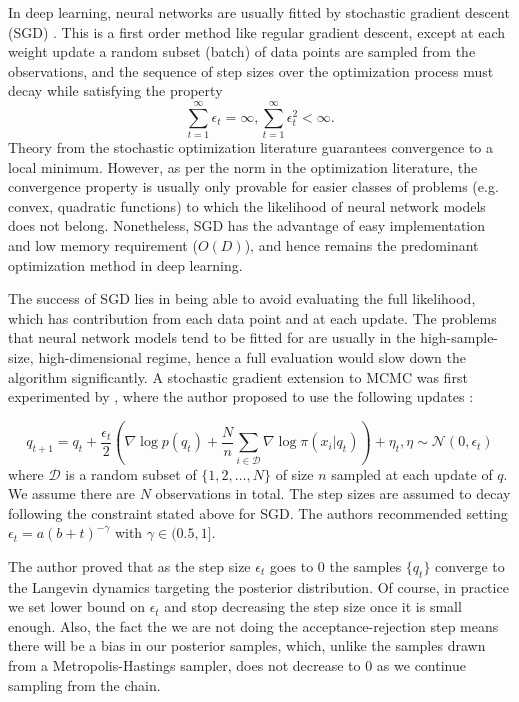 \documentclass[12pt]{report}
\begin{document}
In deep learning, neural networks are usually fitted by stochastic gradient descent (SGD) \cite{ngiam2011optimization}.
This is a first order method like regular gradient descent, except at each weight update a random subset (batch) of data points are sampled from the observations, and the sequence of step sizes over the optimization process must decay while satisfying the property
\[ \sum_{t=1}^\infty \epsilon_t = \infty , \sum_{t=1}^\infty \epsilon_t^2 < \infty. \]
Theory from the stochastic optimization literature \cite{robbins1951stochastic} guarantees convergence to a local minimum. However, as per the norm in the optimization literature, the convergence property is usually only provable for easier classes of problems (e.g. convex, quadratic functions) to which the likelihood of neural network models does not belong. Nonetheless, SGD has the advantage of easy implementation and low memory requirement ($O(D)$), and hence remains the predominant optimization method in deep learning.  

The success of SGD lies in being able to avoid evaluating the full likelihood, which has contribution from each data point and at each update. The problems that neural network models tend to be fitted for are usually in the high-sample-size, high-dimensional regime, hence a full evaluation would slow down the algorithm significantly. A stochastic gradient extension to MCMC was first experimented by \cite{welling2011bayesian}, where the author proposed to use the following updates :

\[q_{t+1} = q_t + \frac{\epsilon_t}{2} ( \nabla \log p(q_t) + \frac{N}{n} \sum_{i \in \mathcal{D}} \nabla \log \pi(x_i|q_t) ) + \eta_t , \eta \sim \mathcal{N}(0,\epsilon_t) \]
where $\mathcal{D}$ is a random subset of $\{1,2, \dots, N\}$ of size $n$ sampled at each update of $q$. We assume there are $N$ observations in total. The step sizes are assumed to decay following the constraint stated above for SGD. The authors recommended setting $\epsilon_t = a(b+t)^{-\gamma} $ with $\gamma \in (0.5,1]$.  

The author proved that as the step size $\epsilon_t$ goes to $0$ the samples $\{q_t\}$ converge to the Langevin dynamics targeting the posterior distribution. Of course, in practice we set lower bound on $\epsilon_t$ and stop decreasing the step size once it is small enough. Also, the fact the we are not doing the acceptance-rejection step means there will be a bias in our posterior samples, which, unlike the samples drawn from a Metropolis-Hastings sampler, does not decrease to $0$ as we continue sampling from the chain.
\end{document}
